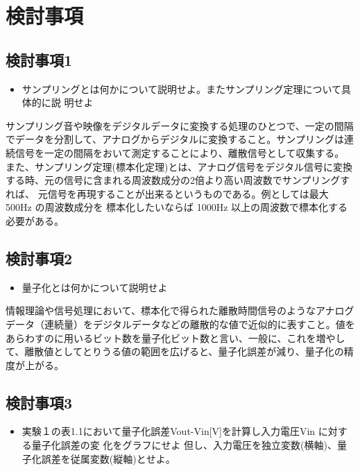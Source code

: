 \documentclass[10pt]{article}
\begin{document}
\section{検討事項}

\subsection{検討事項1}

\begin{itemize}
    \item サンプリングとは何かについて説明せよ。またサンプリング定理について具体的に説 明せよ
\end{itemize}

サンプリング音や映像をデジタルデータに変換する処理のひとつで、一定の間隔でデータを分割して、アナログからデジタルに変換すること。サンプリングは連続信号を一定の間隔をおいて測定することにより、離散信号として収集する。
また、サンプリング定理(標本化定理)とは、アナログ信号をデジタル信号に変換する時、元の信号に含まれる周波数成分の2倍より高い周波数でサンプリングすれば、 元信号を再現することが出来るというものである。例としては最大 500Hz の周波数成分を 標本化したいならば 1000Hz 以上の周波数で標本化する必要がある。 

\subsection{検討事項2}

\begin{itemize}
    \item 量子化とは何かについて説明せよ
\end{itemize}

情報理論や信号処理において、標本化で得られた離散時間信号のようなアナログデータ（連続量）をデジタルデータなどの離散的な値で近似的に表すこと。値をあらわすのに用いるビット数を量子化ビット数と言い、一般に、これを増やして、離散値としてとりうる値の範囲を広げると、量子化誤差が減り、量子化の精度が上がる。 

\subsection{検討事項3}

\begin{itemize}
    \item 実験１の表1.1において量子化誤差Vout-Vin[V]を計算し入力電圧Vin に対する量子化誤差の変 化をグラフにせよ 但し、入力電圧を独立変数(横軸)、量子化誤差を従属変数(縦軸)とせよ。 
\end{itemize}
\end{document}
